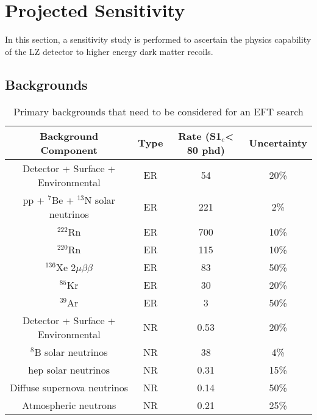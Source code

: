 \section{Projected Sensitivity}
\par
In this section, a sensitivity study is performed to ascertain the physics capability of the LZ detector to higher energy dark matter recoils.


\subsection{Backgrounds}
\par

\begin{table}[]
    \centering
    \begin{tabular}{c|c|c|c}
        Background Component                         & Type    & Rate (S1$_c$< 80 phd)    & Uncertainty  \\ \hline
        Detector + Surface + Environmental           & ER      & 54                       & 20\% \cite{LZ_projected_sensitivity_paper_ref}        \\
        pp + ${}^{7}$Be + ${}^{13}$N solar neutrinos & ER      & 221                      & 2\% \cite{pp_solar_neutrinos_rate_ref}       \\
        ${}^{222}$Rn                                 & ER      & 700                      & 10\%         \\
        ${}^{220}$Rn                                 & ER      & 115                      & 10\%         \\
        ${}^{136}$Xe 2$\mu\beta\beta$                & ER      & 83                       & 50\% \cite{double_beta_decay_rate_ref}        \\
        ${}^{85}$Kr                                  & ER      & 30                       & 20\%          \\
        ${}^{39}$Ar                                  & ER      & 3                        & 50\%         \\
        Detector + Surface + Environmental           & NR      & 0.53                     & 20\% \cite{LZ_projected_sensitivity_paper_ref}         \\
        ${}^{8}$B solar neutrinos                    & NR      & 38                       & 4\%         \\
        hep solar neutrinos                          & NR      & 0.31                     & 15\%         \\
        Diffuse supernova neutrinos                  & NR      & 0.14                     & 50\%         \\
        Atmospheric neutrons                         & NR      & 0.21                     & 25\%       
    \end{tabular}
    \caption{Primary backgrounds that need to be considered for an EFT search}
    \label{tab:projected_lz_backgrounds}
\end{table}

